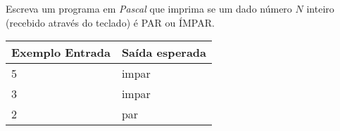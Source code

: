 \item Escreva um programa em \emph{Pascal} que imprima se um dado número $N$ 
inteiro (recebido através do teclado) é PAR ou ÍMPAR.

\begin{center}
\begin{tabular}{|l|l|} \hline
Exemplo Entrada & Saída esperada \\ \hline
5                & impar               \\ \hline
3                & impar               \\ \hline
2                & par               \\ \hline
\end{tabular}
\end{center}